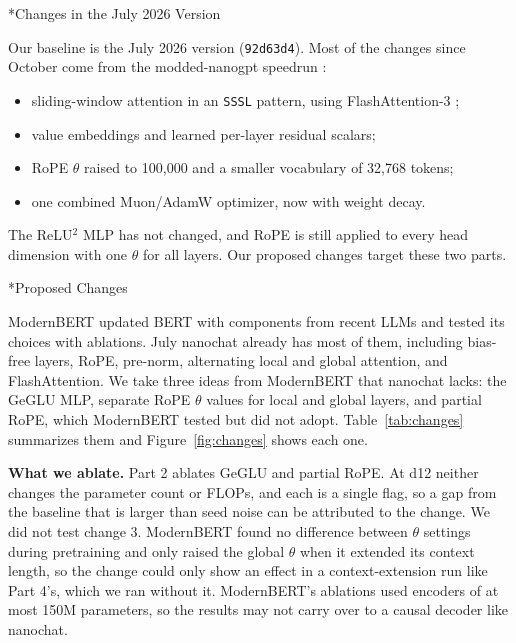 \documentclass[11pt]{article}
\makeatletter
\renewcommand\subsection{\@startsection{subsection}{2}{\z@}{0.6em}{0.2em}{\normalsize\bfseries}}
\newcommand{\code}[1]{\texttt{#1}}
\makeatother
\begin{document}
\subsection*{Changes in the July 2026 Version}

Our baseline is the July 2026 version (\code{92d63d4}). Most of the changes since October come from the modded-nanogpt speedrun \cite{modded}:
\begin{itemize}[leftmargin=1.2em, itemsep=0em, topsep=0.1em, parsep=0em]
  \item sliding-window attention in an \code{SSSL} pattern, using FlashAttention-3 \cite{fa3};
  \item value embeddings \cite{valueres} and learned per-layer residual scalars;
  \item RoPE $\theta$ raised to 100,000 and a smaller vocabulary of 32,768 tokens;
  \item one combined Muon/AdamW optimizer, now with weight decay.
\end{itemize}
The ReLU$^2$ MLP has not changed, and RoPE is still applied to every head dimension with one $\theta$ for all layers. Our proposed changes target these two parts.

\subsection*{Proposed Changes}

ModernBERT \cite{modernbert} updated BERT \cite{bert} with components from recent LLMs and tested its choices with ablations. July nanochat already has most of them, including bias-free layers, RoPE, pre-norm, alternating local and global attention, and FlashAttention. We take three ideas from ModernBERT that nanochat lacks: the GeGLU MLP, separate RoPE $\theta$ values for local and global layers, and partial RoPE, which ModernBERT tested but did not adopt. Table~\ref{tab:changes} summarizes them and Figure~\ref{fig:changes} shows each one.

\textbf{What we ablate.} Part 2 ablates GeGLU and partial RoPE. At d12 neither changes the parameter count or FLOPs, and each is a single flag, so a gap from the baseline that is larger than seed noise can be attributed to the change. We did not test change 3. ModernBERT found no difference between $\theta$ settings during pretraining and only raised the global $\theta$ when it extended its context length, so the change could only show an effect in a context-extension run like Part 4's, which we ran without it. ModernBERT's ablations used encoders of at most 150M parameters, so the results may not carry over to a causal decoder like nanochat.
\end{document}
